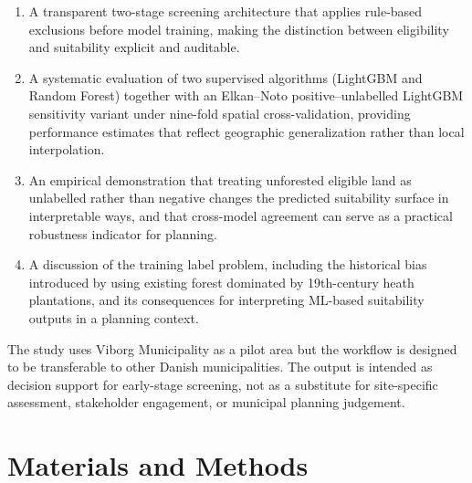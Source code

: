 \documentclass[land,article,submit,moreauthors]{Definitions/mdpi}
\begin{document}
\begin{enumerate}
    \item A transparent two-stage screening architecture that applies rule-based exclusions before model training, making the distinction between eligibility and suitability explicit and auditable.
    
    \item A systematic evaluation of two supervised algorithms (LightGBM and Random Forest) together with an Elkan--Noto positive--unlabelled LightGBM sensitivity variant under nine-fold spatial cross-validation, providing performance estimates that reflect geographic generalization rather than local interpolation.
    
    \item An empirical demonstration that treating unforested eligible land as unlabelled rather than negative changes the predicted suitability surface in interpretable ways, and that cross-model agreement can serve as a practical robustness indicator for planning.
    
    \item A discussion of the training label problem, including the historical bias introduced by using existing forest dominated by 19th-century heath plantations, and its consequences for interpreting ML-based suitability outputs in a planning context.
\end{enumerate}

The study uses Viborg Municipality as a pilot area but the workflow is designed to be transferable to other Danish municipalities. The output is intended as decision support for early-stage screening, not as a substitute for site-specific assessment, stakeholder engagement, or municipal planning judgement.


\section{Materials and Methods}
\end{document}
